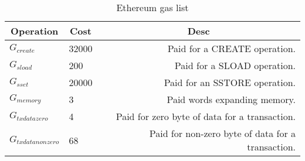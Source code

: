 \begin{table}[]
\begin{tabular}{@{}llr@{}}
\toprule
\multicolumn{1}{c}{Operation} & \multicolumn{1}{c}{Cost} & \multicolumn{1}{c}{Desc} \\
\midrule
$G_{create}$ & 32000 & Paid for a CREATE operation.\\
$G_{sload}$ & 200 & Paid for a SLOAD operation.\\
$G_{sset}$ & 20000 & Paid for an SSTORE operation.\\
$G_{memory}$ & 3 & Paid words expanding memory.\\
$G_{txdatazero}$ & 4 & Paid for zero byte of data for a transaction.\\
$G_{txdatanonzero}$ & 68 & Paid for non-zero byte of data for a transaction.\\
\end{tabular}
\caption{Ethereum gas list}
\label{table:ethereum_gas_list}
\centering
\end{table}
